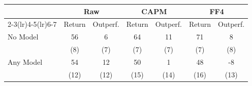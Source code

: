 \begin{tabular}{lcccccc}
   \toprule
   & \multicolumn{2}{c}{Raw} & \multicolumn{2}{c}{CAPM} & \multicolumn{2}{c}{FF4} \\
   \cmidrule(lr){2-3}\cmidrule(lr){4-5}\cmidrule(lr){6-7}
   & Return & Outperf. & Return & Outperf. & Return & Outperf. \\
   \midrule
   No Model & 56 & 6 & 64 & 11 & 71 & 8 \\
   & (8) & (7) & (7) & (7) & (7) & (8) \\
   Any Model & 54 & 12 & 50 & 1 & 48 & -8 \\
   & (12) & (12) & (15) & (14) & (16) & (13) \\
   \bottomrule
\end{tabular}
